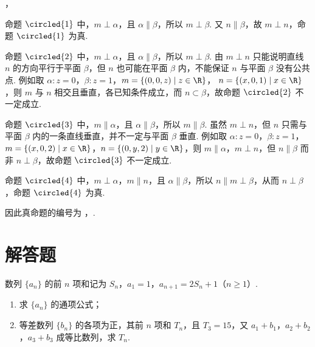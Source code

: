 \begin{answer}
，
\end{answer}

\begin{solution}
命题 \(\circled{1}\) 中，\(m\perp\alpha\)，且 \(\alpha\parallel\beta\)，所以 \(m\perp\beta\). 又
\(n\parallel\beta\)，故 \(m\perp n\)，命题 \(\circled{1}\) 为真.

命题 \(\circled{2}\) 中，\(m\perp\alpha\)，且 \(\alpha\parallel\beta\)，所以 \(m\perp\beta\). 由
\(m\perp n\) 只能说明直线 \(n\) 的方向平行于平面 \(\beta\)，但 \(n\) 也可能在平面 \(\beta\) 内，不能保证 \(n\) 与平面 \(\beta\) 没有公共点. 例如取
\(\alpha:z=0\)，\(\beta:z=1\)，\(m=\{(0,0,z)\mid z\in\R\}\)，
\(n=\{(x,0,1)\mid x\in\R\}\)，则 \(m\) 与 \(n\) 相交且垂直，各已知条件成立，而
\(n\subset\beta\)，故命题 \(\circled{2}\) 不一定成立.

命题 \(\circled{3}\) 中，\(m\parallel\alpha\)，且 \(\alpha\parallel\beta\)，所以 \(m\parallel\beta\).
虽然 \(m\perp n\)，但 \(n\) 只需与平面 \(\beta\) 内的一条直线垂直，并不一定与平面
\(\beta\) 垂直. 例如取 \(\alpha:z=0\)，\(\beta:z=1\)，
\(m=\{(x,0,2)\mid x\in\R\}\)，\(n=\{(0,y,2)\mid y\in\R\}\)，则
\(m\parallel\alpha\)，\(m\perp n\)，但 \(n\parallel\beta\) 而非
\(n\perp\beta\)，故命题 \(\circled{3}\) 不一定成立.

命题 \(\circled{4}\) 中，\(m\perp\alpha\)，\(m\parallel n\)，且 \(\alpha\parallel\beta\)，所以
\(n\parallel m\perp\beta\)，从而 \(n\perp\beta\)，命题 \(\circled{4}\) 为真.

因此真命题的编号为 ，.
\end{solution}

\section{解答题}
\begin{problem}
数列 \(\{a_{n}\}\) 的前 \(n\) 项和记为 \(S_{n}\)，\(a_{1} = 1\)，\(a_{n+1} = 2S_{n} + 1\)（\(n \geqslant 1\)）.

\begin{enumerate}
\item 求 \(\{a_{n}\}\) 的通项公式；
\item 等差数列 \(\{b_{n}\}\) 的各项为正，其前 \(n\) 项和 \(T_{n}\)，且 \(T_{3}=15\)，又 \(a_{1}+b_{1}\)，\(a_{2}+b_{2}\)，\(a_{3}+b_{3}\) 成等比数列，求 \(T_{n}\).
\end{enumerate}
\end{problem}

